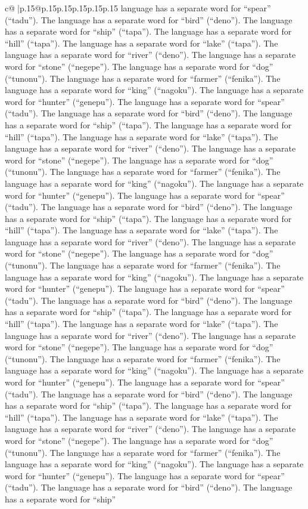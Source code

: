 \documentclass{article}
\begin{document}
{\begin{supertabular}{c@{$\;$}|p{.15\linewidth}@{}p{.15\linewidth}p{.15\linewidth}p{.15\linewidth}p{.15\linewidth}p{.15\linewidth}}
{{{language has a separate word for “spear” (“tadu”). The language has a separate word for “bird” (“deno”). The language has a separate word for “ship” (“tapa”). The language has a separate word for “hill” (“tapa”). The language has a separate word for “lake” (“tapa”). The language has a separate word for “river” (“deno”). The language has a separate word for “stone” (“negepe”). The language has a separate word for “dog” (“tunonu”). The language has a separate word for “farmer” (“fenika”). The language has a separate word for “king” (“nagoku”). The language has a separate word for “hunter” (“genepu”). The language has a separate word for “spear” (“tadu”). The language has a separate word for “bird” (“deno”). The language has a separate word for “ship” (“tapa”). The language has a separate word for “hill” (“tapa”). The language has a separate word for “lake” (“tapa”). The language has a separate word for “river” (“deno”). The language has a separate word for “stone” (“negepe”). The language has a separate word for “dog” (“tunonu”). The language has a separate word for “farmer” (“fenika”). The language has a separate word for “king” (“nagoku”). The language has a separate word for “hunter” (“genepu”). The language has a separate word for “spear” (“tadu”). The language has a separate word for “bird” (“deno”). The language has a separate word for “ship” (“tapa”). The language has a separate word for “hill” (“tapa”). The language has a separate word for “lake” (“tapa”). The language has a separate word for “river” (“deno”). The language has a separate word for “stone” (“negepe”). The language has a separate word for “dog” (“tunonu”). The language has a separate word for “farmer” (“fenika”). The language has a separate word for “king” (“nagoku”). The language has a separate word for “hunter” (“genepu”). The language has a separate word for “spear” (“tadu”). The language has a separate word for “bird” (“deno”). The language has a separate word for “ship” (“tapa”). The language has a separate word for “hill” (“tapa”). The language has a separate word for “lake” (“tapa”). The language has a separate word for “river” (“deno”). The language has a separate word for “stone” (“negepe”). The language has a separate word for “dog” (“tunonu”). The language has a separate word for “farmer” (“fenika”). The language has a separate word for “king” (“nagoku”). The language has a separate word for “hunter” (“genepu”). The language has a separate word for “spear” (“tadu”). The language has a separate word for “bird” (“deno”). The language has a separate word for “ship” (“tapa”). The language has a separate word for “hill” (“tapa”). The language has a separate word for “lake” (“tapa”). The language has a separate word for “river” (“deno”). The language has a separate word for “stone” (“negepe”). The language has a separate word for “dog” (“tunonu”). The language has a separate word for “farmer” (“fenika”). The language has a separate word for “king” (“nagoku”). The language has a separate word for “hunter” (“genepu”). The language has a separate word for “spear” (“tadu”). The language has a separate word for “bird” (“deno”). The language has a separate word for “ship” }}}
\end{supertabular}}
\end{document}
